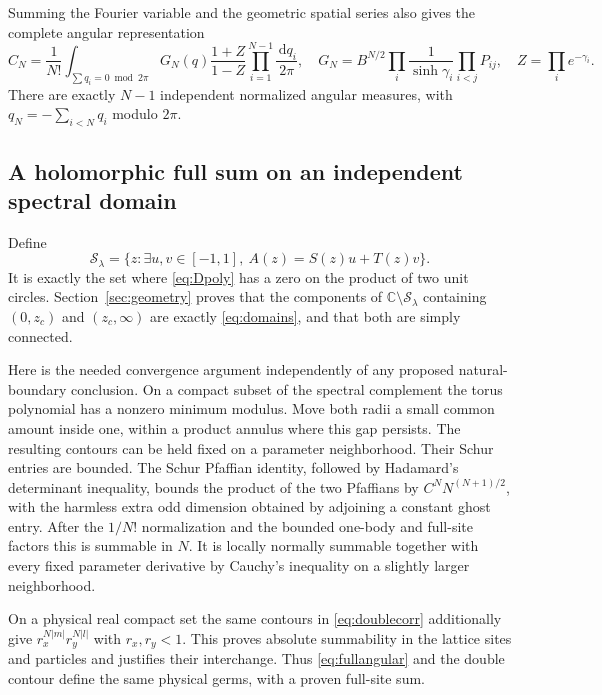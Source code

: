 \documentclass[11pt]{article}
\numberwithin{equation}{section}
\theoremstyle{definition}
\newcommand{\C}{\mathbb C}
\newcommand{\dd}{\,\mathrm d}
\newcommand{\cS}{\mathcal S}
\begin{document}
Summing the Fourier variable and the geometric spatial series also gives
the complete angular representation
\begin{equation}\label{eq:fullangular}
 C_N=\frac1{N!}\int_{\sum q_i=0\bmod2\pi}
 G_N(q)\frac{1+Z}{1-Z}\prod_{i=1}^{N-1}\frac{\dd q_i}{2\pi},\quad
 G_N=B^{N/2}\prod_i\frac1{\sinh\gamma_i}\prod_{i<j}P_{ij},\quad
 Z=\prod_i e^{-\gamma_i}.
\end{equation}
There are exactly $N-1$ independent normalized angular measures, with
$q_N=-\sum_{i<N}q_i$ modulo $2\pi$.

\subsection{A holomorphic full sum on an independent spectral domain}
Define
\begin{equation}\label{eq:physicalspectralset}
 \cS_\lambda=\{z:\exists u,v\in[-1,1],\ A(z)=S(z)u+T(z)v\}.
\end{equation}
It is exactly the set where \eqref{eq:Dpoly} has a zero on the product
of two unit circles. Section~\ref{sec:geometry} proves that the components
of $\C\setminus\cS_\lambda$ containing $(0,z_c)$ and $(z_c,\infty)$
are exactly \eqref{eq:domains}, and that both are simply connected.

Here is the needed convergence argument independently of any proposed
natural-boundary conclusion. On a compact subset of the spectral
complement the torus polynomial has a nonzero minimum modulus. Move
both radii a small common amount inside one, within a product annulus
where this gap persists. The resulting contours can be held fixed on
a parameter neighborhood. Their Schur entries are bounded. The Schur
Pfaffian identity, followed by Hadamard's determinant inequality, bounds
the product of the two Pfaffians by
$C^N N^{(N+1)/2}$, with the harmless extra odd dimension obtained by
adjoining a constant ghost entry. After the $1/N!$ normalization and
the bounded one-body and full-site factors this is summable in $N$.
It is locally normally summable together with every fixed parameter
derivative by Cauchy's inequality on a slightly larger neighborhood.

On a physical real compact set the same contours in
\eqref{eq:doublecorr} additionally give
$r_x^{N|m|}r_y^{N|l|}$ with $r_x,r_y<1$. This proves absolute summability
in the lattice sites and particles and justifies their interchange.
Thus \eqref{eq:fullangular} and the double contour define the same
physical germs, with a proven full-site sum.
\end{document}
